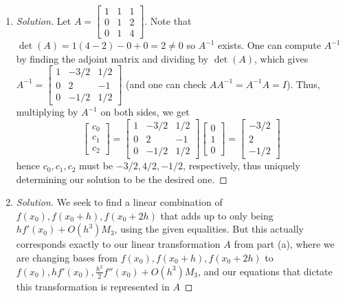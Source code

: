 \documentclass{article}
\begin{document}
\begin{enumerate}
	\item \begin{proof}[Solution]\let\qed\relax
		Let $A = \begin{bmatrix}
				1 & 1 & 1\\
				0 & 1 & 2\\
				0 & 1 & 4
			\end{bmatrix}$.
		Note that $\det(A) = 1(4-2) - 0 + 0 = 2 \neq 0$ so $A^{-1}$ exists.
		One can compute $A^{-1}$ by finding the adjoint matrix and dividing by $\det(A)$,
		which gives $A^{-1} = \begin{bmatrix}
				1 & -3/2 & 1/2\\
				0 & 2 & -1\\
				0 & -1/2 & 1/2
			\end{bmatrix}$
		(and one can check $AA^{-1} = A^{-1}A = I$).
		Thus, multiplying by $A^{-1}$ on both sides, we get
		\[
			\begin{bmatrix} c_0 \\ c_1 \\ c_2 \end{bmatrix}
			= \begin{bmatrix}
				1 & -3/2 & 1/2\\
				0 & 2 & -1\\
				0 & -1/2 & 1/2
			\end{bmatrix}
			\begin{bmatrix} 0 \\ 1 \\ 0 \end{bmatrix}
			= \begin{bmatrix} -3/2 \\ 2 \\ -1/2 \end{bmatrix}
		\]
		hence $c_0,c_1,c_2$ must be $-3/2,4/2,-1/2$, respectively,
		thus uniquely determining our solution to be the desired one.
	\end{proof}
	\item \begin{proof}[Solution]\let\qed\relax
		We seek to find a linear combination of $f(x_0),f(x_0 + h), f(x_0 + 2h)$
		that adds up to only being $hf'(x_0) + O(h^3)M_3$,
		using the given equalities.
		But this actually corresponds exactly to our linear transformation
		$A$ from part (a),
		where we are changing bases from $f(x_0),f(x_0+h),f(x_0+2h)$
		to $f(x_0),hf'(x_0),\frac{h^2}{2}f''(x_0) + O(h^3)M_3$,
		and our equations that dictate this transformation is represented in $A$

\end{proof}
\end{enumerate}
\end{document}
